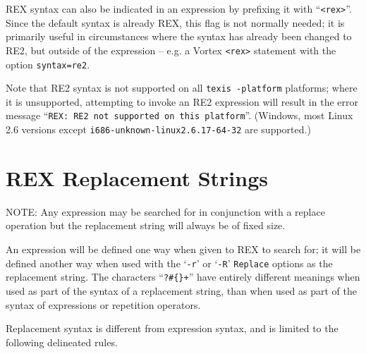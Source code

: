 REX syntax can also be indicated in an expression by prefixing it with
``{\tt {}<rex>}''.  Since the default syntax is already REX, this
flag is not normally needed; it is primarily useful in circumstances
where the syntax has already been changed to RE2, but outside of the
expression -- e.g. a Vortex \verb`<rex>` statement with the option
\verb`syntax=re2`.

Note that RE2 syntax is not supported on all {\tt texis -platform}
platforms; where it is unsupported, attempting to invoke an RE2
expression will result in the error message
``{\tt REX: RE2 not supported on this platform}''.  (Windows,
most Linux 2.6 versions except {\tt i686-unknown-linux2.6.17-64-32}
are supported.)


\section{REX Replacement Strings}

NOTE:  Any expression may be searched for in conjunction with a replace
operation but the replacement string will always be of fixed size.

An expression will be defined one way when given to REX to search for;
it will be defined another way when used with the `\verb`-r`' or `\verb`-R`'
\verb`Replace` options as the replacement string.  The characters
``\verb`?#{}+`'' have entirely different meanings when used as part of the
syntax of a replacement string, than when used as part of the syntax of
expressions or repetition operators.

Replacement syntax is different from expression syntax, and is limited to the
following delineated rules.

